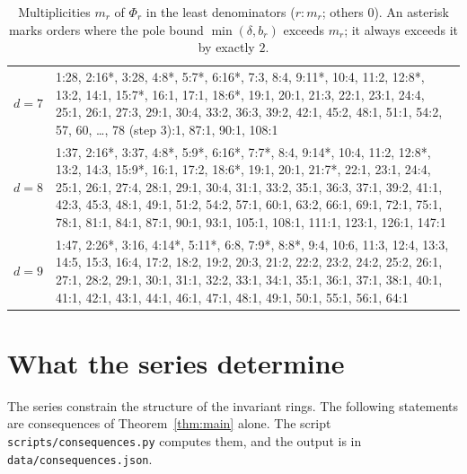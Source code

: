 \documentclass[11pt]{amsart}
\theoremstyle{definition}
\theoremstyle{remark}
\begin{document}
\begin{table}[h]\small
\caption{Multiplicities $m_r$ of $\Phi_r$ in the least denominators ($r{:}m_r$; others $0$). An asterisk marks orders where the pole bound $\min(\delta,b_r)$ exceeds $m_r$; it always exceeds it by exactly $2$.}\label{tab:mult}
\begin{tabular}{@{}p{}p{}@{}}
\toprule
$d=7$ & 1:28, 2:16*, 3:28, 4:8*, 5:7*, 6:16*, 7:3, 8:4, 9:11*, 10:4, 11:2, 12:8*, 13:2, 14:1, 15:7*, 16:1, 17:1, 18:6*, 19:1, 20:1, 21:3, 22:1, 23:1, 24:4, 25:1, 26:1, 27:3, 29:1, 30:4, 33:2, 36:3, 39:2, 42:1, 45:2, 48:1, 51:1, 54:2, 57, 60, \dots, 78 (step 3):1, 87:1, 90:1, 108:1\\[3pt]
$d=8$ & 1:37, 2:16*, 3:37, 4:8*, 5:9*, 6:16*, 7:7*, 8:4, 9:14*, 10:4, 11:2, 12:8*, 13:2, 14:3, 15:9*, 16:1, 17:2, 18:6*, 19:1, 20:1, 21:7*, 22:1, 23:1, 24:4, 25:1, 26:1, 27:4, 28:1, 29:1, 30:4, 31:1, 33:2, 35:1, 36:3, 37:1, 39:2, 41:1, 42:3, 45:3, 48:1, 49:1, 51:2, 54:2, 57:1, 60:1, 63:2, 66:1, 69:1, 72:1, 75:1, 78:1, 81:1, 84:1, 87:1, 90:1, 93:1, 105:1, 108:1, 111:1, 123:1, 126:1, 147:1\\[3pt]
$d=9$ & 1:47, 2:26*, 3:16, 4:14*, 5:11*, 6:8, 7:9*, 8:8*, 9:4, 10:6, 11:3, 12:4, 13:3, 14:5, 15:3, 16:4, 17:2, 18:2, 19:2, 20:3, 21:2, 22:2, 23:2, 24:2, 25:2, 26:1, 27:1, 28:2, 29:1, 30:1, 31:1, 32:2, 33:1, 34:1, 35:1, 36:1, 37:1, 38:1, 40:1, 41:1, 42:1, 43:1, 44:1, 46:1, 47:1, 48:1, 49:1, 50:1, 55:1, 56:1, 64:1\\
\bottomrule
\end{tabular}
\end{table}

\section{What the series determine}\label{sec:cons}

The series constrain the structure of the invariant rings. The following statements are consequences of Theorem~\ref{thm:main} alone. The script \texttt{scripts/consequences.py} computes them, and the output is in \texttt{data/consequences.json}.
\end{document}
